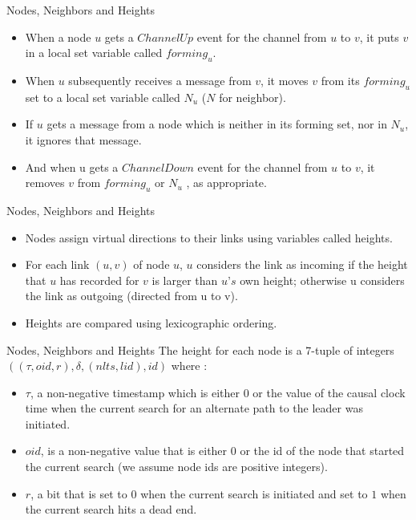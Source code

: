 \documentclass{beamer}
\begin{document}
\begin{frame}{Nodes, Neighbors and Heights}
\begin{itemize}
	\item When a node $u$ gets a $ChannelUp$ event for the channel from $u$ to $v$, it puts $v$ in a local set variable called $forming_u$.
	\item When $u$ subsequently receives a message from $v$, it moves $v$ from its $forming_u$ set to a local set variable called $N_u$ ($N$ for neighbor).
	\item If $u$ gets a message from a node which is neither in its forming set, nor in $N_u$, it ignores that message.
	\item And when u gets a $ChannelDown$ event for the channel from $u$ to $v$, it removes $v$ from $forming_u$ or $N_u$ , as appropriate. 
\end{itemize}
\end{frame}

\begin{frame}{Nodes, Neighbors and Heights}
	\begin{itemize}
		\item Nodes assign virtual directions to their links using variables called heights.
		\item For each link $(u, v)$ of node $u$, $u$ considers the link as incoming if the height that $u$ has recorded for $v$ is larger than $u’s$ own height; otherwise u considers the link as outgoing (directed from u to v).
		\item Heights are compared using lexicographic ordering.
	\end{itemize}
\end{frame}
\begin{frame}{Nodes, Neighbors and Heights}
		The height for each node is a 7-tuple of integers $((\tau , oid, r), \delta , (nlts, lid), id)$ where :
		\begin{itemize}
			\item $\tau$, a non-negative timestamp which is either 0 or the value of the causal clock time when the current search for an alternate path to the leader was initiated.
			\item $oid$, is a non-negative value that is either 0 or the id of the node that started the current search (we assume node ids are positive integers).
			\item $r$, a bit that is set to $0$ when the current search is initiated and set to $1$ when the current search hits a dead end.
		\end{itemize}
\end{frame}
\end{document}

